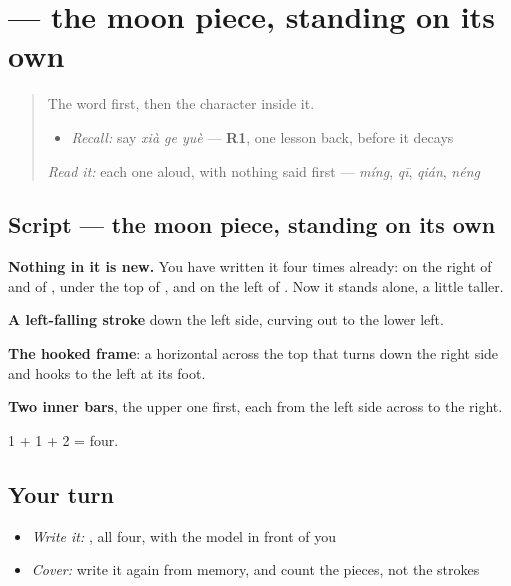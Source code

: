 \section[\texorpdfstring{\zh{月} (yuè)}{月 (yuè)}]{ — the moon piece, standing on its own}

\label{lesson:ZH-W148-yue-month}



\begin{quote}
The word first, then the character inside it.

\begin{itemize}
\raggedright
  \item \emph{Recall:} say \emph{xià ge yuè} — \textbf{R1}, one lesson back, before it decays
\end{itemize}

\begin{quote}
   
\end{quote}

\emph{Read it:} each one aloud, with nothing said first — \emph{míng}, \emph{qī}, \emph{qián}, \emph{néng}
\end{quote}

\subsection*{Script — the moon piece, standing on its own}

\begin{quote}
\end{quote}

\textbf{Nothing in it is new.} You have written it four times already: on the right of  and of , under the top of , and on the left of . Now it stands alone, a little taller.

\textbf{A left-falling stroke} down the left side, curving out to the lower left.

\textbf{The hooked frame}: a horizontal across the top that turns down the right side and hooks to the left at its foot.

\textbf{Two inner bars}, the upper one first, each from the left side across to the right.

1 + 1 + 2 = four.

\subsection*{Your turn}
\begin{itemize}
\raggedright
  \item \emph{Write it:} , all four, with the model in front of you
  \item \emph{Cover:} write it again from memory, and count the pieces, not the strokes
\end{itemize}

